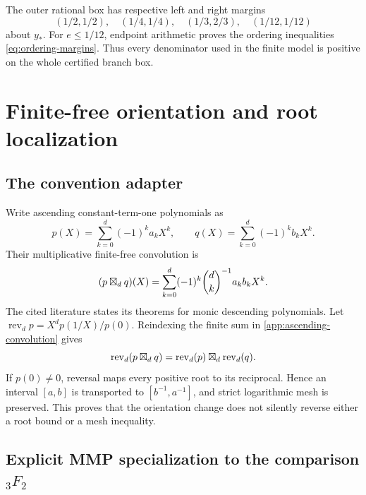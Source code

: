 The outer rational box has respective left and right margins
\[
 (1/2,1/2),\quad(1/4,1/4),\quad(1/3,2/3),\quad(1/12,1/12)
\]
about $y_*$.  For $e\le1/12$, endpoint arithmetic proves the ordering
inequalities \eqref{eq:ordering-margins}.  Thus every denominator used in
the finite model is positive on the whole certified branch box.

\section{Finite-free orientation and root localization}\label{app:finitefree-details}

\subsection{The convention adapter}

Write ascending constant-term-one polynomials as
\[
 p(X)=\sum_{k=0}^d(-1)^ka_kX^k,\qquad
 q(X)=\sum_{k=0}^d(-1)^kb_kX^k.
\]
Their multiplicative finite-free convolution is
\begin{equation}\label{app:ascending-convolution}
 (p\boxtimes_d q)(X)=
 \sum_{k=0}^d(-1)^k\binom dk^{-1}a_kb_kX^k.
\end{equation}
The cited literature states its theorems for monic descending polynomials.
Let $\operatorname{rev}_d p=X^dp(1/X)/p(0)$.  Reindexing the finite sum in
\eqref{app:ascending-convolution} gives
\[
 \operatorname{rev}_d(p\boxtimes_d q)
 =\operatorname{rev}_d(p)\boxtimes_d\operatorname{rev}_d(q).
\]
If $p(0)\ne0$, reversal maps every positive root to its reciprocal.  Hence
an interval $[a,b]$ is transported to $[b^{-1},a^{-1}]$, and strict
logarithmic mesh is preserved.  This proves that the orientation change
does not silently reverse either a root bound or a mesh inequality.

\subsection{Explicit MMP specialization to the comparison ${}_3F_2$}
\label{app:mmp-specialization}

